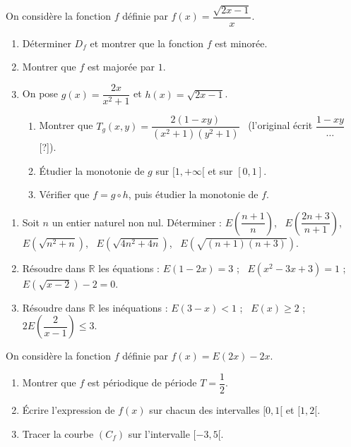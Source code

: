 On considère la fonction $f$ définie par $f(x)=\dfrac{\sqrt{2x-1}}{x}$.
\begin{enumerate}
\item Déterminer $D_f$ et montrer que la fonction $f$ est minorée.
\item Montrer que $f$ est majorée par $1$.
\item On pose $g(x)=\dfrac{2x}{x^2+1}$ et $h(x)=\sqrt{2x-1}$.
\begin{enumerate}
\item Montrer que $T_g(x,y)=\dfrac{2(1-xy)}{\left(x^2+1\right)\left(y^2+1\right)}$ \ (l'original écrit $\dfrac{1-xy}{\dots}$ [?]).
\item Étudier la monotonie de $g$ sur $[1,+\infty[$ et sur $[0,1]$.
\item Vérifier que $f=g\circ h$, puis étudier la monotonie de $f$.
\end{enumerate}
\end{enumerate}
\fin
{}
\begin{enumerate}
\item Soit $n$ un entier naturel non nul. Déterminer :
$E\!\left(\dfrac{n+1}{n}\right)$, \ $E\!\left(\dfrac{2n+3}{n+1}\right)$, \ $E\!\left(\sqrt{n^2+n}\right)$, \ $E\!\left(\sqrt{4n^2+4n}\right)$, \ $E\!\left(\sqrt{(n+1)(n+3)}\right)$.
\item Résoudre dans $\mathbb{R}$ les équations : $E(1-2x)=3$ ; \ $E\!\left(x^2-3x+3\right)=1$ ; \ $E\!\left(\sqrt{x-2}\right)-2=0$.
\item Résoudre dans $\mathbb{R}$ les inéquations : $E(3-x)<1$ ; \ $E(x)\geq2$ ; \ $2E\!\left(\dfrac{2}{x-1}\right)\leq3$.
\end{enumerate}
\fin
{}
On considère la fonction $f$ définie par $f(x)=E(2x)-2x$.
\begin{enumerate}
\item Montrer que $f$ est périodique de période $T=\dfrac12$.
\item Écrire l'expression de $f(x)$ sur chacun des intervalles $[0,1[$ et $[1,2[$.
\item Tracer la courbe $(C_f)$ sur l'intervalle $[-3,5[$.
\end{enumerate}
\fin
